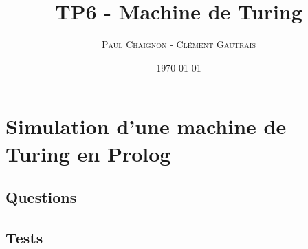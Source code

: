 \documentclass[a4paper,12pt]{article}
\title{TP6 - Machine de Turing}
\author{\textsc{Paul Chaignon} - \textsc{Clément Gautrais}}
\date{\today}
\begin{document}
\maketitle

\section{Simulation d'une machine de Turing en Prolog}

\subsection{Questions}


\vspace{2cm}

\subsection{Tests}


\end{document}
